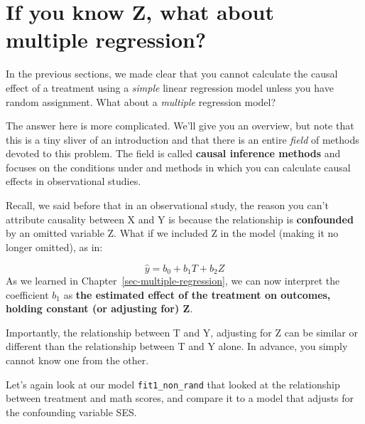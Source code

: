 \documentclass[
  letterpaper,
  DIV=11,
  numbers=noendperiod]{scrreprt}
\newenvironment{Shaded}{\begin{snugshade}}{\end{snugshade}}
\newcommand{\AttributeTok}[1]{\textcolor[rgb]{0.40,0.45,0.13}{#1}}
\newcommand{\FunctionTok}[1]{\textcolor[rgb]{0.28,0.35,0.67}{#1}}
\newcommand{\NormalTok}[1]{\textcolor[rgb]{0.00,0.23,0.31}{#1}}
\newcommand{\OtherTok}[1]{\textcolor[rgb]{0.00,0.23,0.31}{#1}}
\newcommand{\SpecialCharTok}[1]{\textcolor[rgb]{0.37,0.37,0.37}{#1}}
\theoremstyle{definition}
\theoremstyle{remark}
\begin{document}
\hypertarget{if-you-know-z-what-about-multiple-regression}{%
\section{If you know Z, what about multiple
regression?}\label{if-you-know-z-what-about-multiple-regression}}

In the previous sections, we made clear that you cannot calculate the
causal effect of a treatment using a \emph{simple} linear regression
model unless you have random assignment. What about a \emph{multiple}
regression model?

The answer here is more complicated. We'll give you an overview, but
note that this is a tiny sliver of an introduction and that there is an
entire \emph{field} of methods devoted to this problem. The field is
called \textbf{causal inference methods} and focuses on the conditions
under and methods in which you can calculate causal effects in
observational studies.

Recall, we said before that in an observational study, the reason you
can't attribute causality between X and Y is because the relationship is
\textbf{confounded} by an omitted variable Z. What if we included Z in
the model (making it no longer omitted), as in:

\[\hat{y} = b_0 + b_1T + b_2Z\] As we learned in
Chapter~\ref{sec-multiple-regression}, we can now interpret the
coefficient \(b_1\) as \textbf{the estimated effect of the treatment on
outcomes, holding constant (or adjusting for) Z}.

Importantly, the relationship between T and Y, adjusting for Z can be
similar or different than the relationship between T and Y alone. In
advance, you simply cannot know one from the other.

Let's again look at our model \texttt{fit1\_non\_rand} that looked at
the relationship between treatment and math scores, and compare it to a
model that adjusts for the confounding variable SES.

\begin{Shaded}
\end{Shaded}
\end{document}
